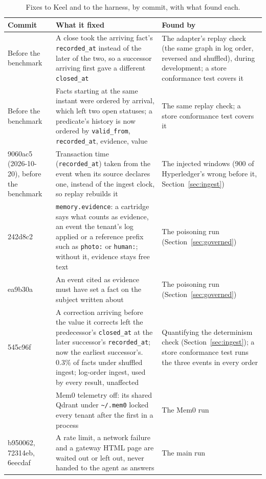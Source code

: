 \documentclass{article}
\newcommand{\code}[1]{\texttt{#1}}
\begin{document}
\begin{table}[htbp]
\caption{Fixes to Keel and to the harness, by commit, with what found each.}
\label{tab:fixes}
\centering
\footnotesize
\begin{tabularx}{\textwidth}{P{1.1in} L L}
\toprule
Commit & What it fixed & Found by \\
\midrule
Before the benchmark & A close took the arriving fact's \code{recorded\_at} instead of the later of the two, so a successor arriving first gave a different \code{closed\_at} & The adapter's replay check (the same graph in log order, reversed and shuffled), during development; a store conformance test covers it \\
\addlinespace
Before the benchmark & Facts starting at the same instant were ordered by arrival, which left two open statuses; a predicate's history is now ordered by \code{valid\_from}, \code{recorded\_at}, evidence, value & The same replay check; a store conformance test covers it \\
\addlinespace
9060ac5 (2026-10-20), before the benchmark & Transaction time (\code{recorded\_at}) taken from the event when its source declares one, instead of the ingest clock, so replay rebuilds it & The injected windows (900 of Hyperledger's wrong before it, Section~\ref{sec:ingest}) \\
\addlinespace
242d8c2 & \code{memory.evidence}: a cartridge says what counts as evidence, an event the tenant's log applied or a reference prefix such as \code{photo:} or \code{human:}; without it, evidence stays free text & The poisoning run (Section~\ref{sec:governed}) \\
\addlinespace
ea9b30a & An event cited as evidence must have set a fact on the subject written about & The poisoning run (Section~\ref{sec:governed}) \\
\addlinespace
545c96f & A correction arriving before the value it corrects left the predecessor's \code{closed\_at} at the later successor's \code{recorded\_at}; now the earliest successor's. 0.3\% of facts under shuffled ingest; log-order ingest, used by every result, unaffected & Quantifying the determinism check (Section~\ref{sec:ingest}); a store conformance test runs the three events in every order \\
 & Mem0 telemetry off: its shared Qdrant under \code{\textasciitilde/.mem0} locked every tenant after the first in a process & The Mem0 run \\
\addlinespace
b950062, 72314eb, 6eecdaf & A rate limit, a network failure and a gateway HTML page are waited out or left out, never handed to the agent as answers & The main run \\
\bottomrule
\end{tabularx}
\end{table}
\end{document}
